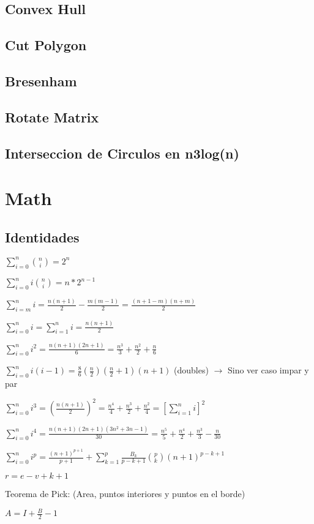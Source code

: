 \subsection{Convex Hull}
\subsection{Cut Polygon}
\subsection{Bresenham}
\subsection{Rotate Matrix}
\subsection{Interseccion de Circulos en n3log(n)}


\section{Math}%
\subsection{Identidades}
{
$\sum_{i=0}^n\binom{n}{i}=2^n$

$\sum_{i=0}^n i\binom{n}{i}=n*2^{n-1}$

$\sum_{i=m}^n i = \frac{n(n+1)}{2} - \frac{m(m-1)}{2} = \frac{(n+1-m)(n+m)}{2}$

$\sum_{i=0}^n i = \sum_{i=1}^n i = \frac{n(n+1)}{2}$

$\sum_{i=0}^n i^2 = \frac{n(n+1)(2n+1)}{6} = \frac{n^3}{3} + \frac{n^2}{2} + \frac{n}{6}$

$\sum_{i=0}^n i(i-1) = \frac{8}{6}(\frac{n}{2})(\frac{n}{2}+1)(n+1)$ (doubles) $\rightarrow$ Sino ver caso impar y par

$\sum_{i=0}^n i^3 = \left(\frac{n(n+1)}{2}\right)^2 = \frac{n^4}{4} + \frac{n^3}{2} + \frac{n^2}{4} = \left[\sum_{i=1}^n i\right]^2$

$\sum_{i=0}^n i^4 = \frac{n(n+1)(2n+1)(3n^2+3n-1)}{30} = \frac{n^5}{5} + \frac{n^4}{2} + \frac{n^3}{3} - \frac{n}{30}$

$\sum_{i=0}^n i^p = \frac{(n+1)^{p+1}}{p+1} + \sum_{k=1}^p\frac{B_k}{p-k+1}{p\choose k}(n+1)^{p-k+1}$

$r=e-v+k+1$

Teorema de Pick: (Area, puntos interiores y puntos en el borde)

$A=I+\frac{B}{2}-1$


}%
